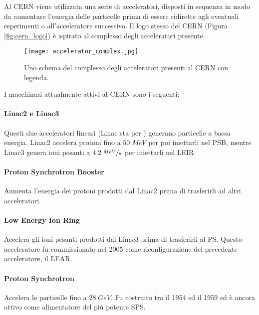		Al \ac{CERN} viene utilizzata una serie di acceleratori, disposti in sequenza in modo da aumentare l'energia delle particelle prima di essere ridirette agli eventuali esperimenti o all'acceleratore successivo. Il logo stesso del \ac{CERN} (Figura \ref{fig:cern_logo}) è ispirato al complesso degli acceleratori presente.\\
			
		\begin{figure}[h!]
			\begin{center}
				\texttt{[image: accelerator\_complex.jpg]}
			\end{center}
			\caption[Complesso degli acceleratori]{Uno schema del complesso degli acceleratori presenti al CERN con legenda.}
			\label{fig:accelerator_complex}
		\end{figure}
		\noindent
		I macchinari attualmente attivi al \ac{CERN} sono i seguenti:
		
		\paragraph{Linac2 e Linac3}Questi due acceleratori lineari (\acs{Linac} sta per ) generano particelle a bassa energia. Linac2 accelera protoni fino a $50 \; MeV$ per poi iniettarli nel \ac{PSB}, mentre Linac3 genera ioni pesanti a $4.2 \; \sfrac{MeV}{u}$ per iniettarli nel \ac{LEIR}.
		
		\paragraph{Proton Synchrotron Booster}Aumenta l'energia dei protoni prodotti dal Linac2 prima di trasferirli ad altri acceleratori.
		
		\paragraph{Low Energy Ion Ring}Accelera gli ioni pesanti prodotti dal Linac3 prima di trasferirli al \ac{PS}. Questo acceleratore fu commissionato nel 2005 come riconfigurazione del precedente acceleratore, il \ac{LEAR}.
		
		\paragraph{Proton Synchrotron}Accelera le particelle fino a $28 \; GeV$. Fu costruito tra il 1954 ed il 1959 ed è ancora attivo come alimentatore del più potente \ac{SPS}.
		
